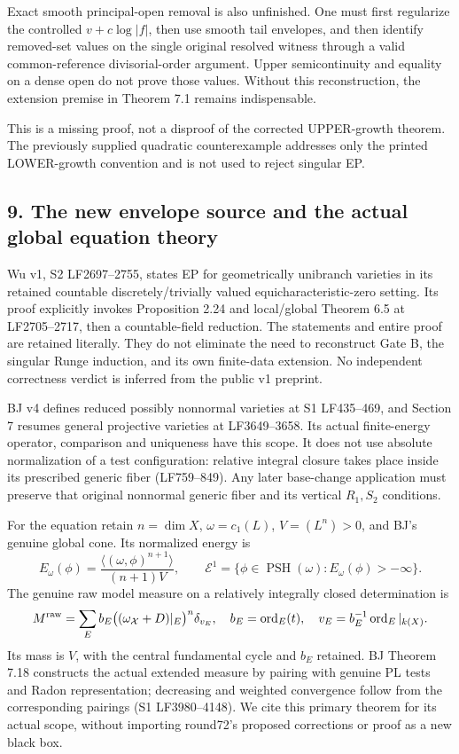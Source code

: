\documentclass[
  10pt,
]{article}
\begin{document}
Exact smooth principal-open removal is also unfinished. One must first
regularize the controlled \(v+c\log|f|\), then use smooth tail
envelopes, and then identify removed-set values on the single original
resolved witness through a valid common-reference divisorial-order
argument. Upper semicontinuity and equality on a dense open do not prove
those values. Without this reconstruction, the extension premise in
Theorem 7.1 remains indispensable.

This is a missing proof, not a disproof of the corrected UPPER-growth
theorem. The previously supplied quadratic counterexample addresses only
the printed LOWER-growth convention and is not used to reject singular
EP.

\subsection{9. The new envelope source and the actual global equation
theory}\label{the-new-envelope-source-and-the-actual-global-equation-theory}

Wu v1, S2 LF2697--2755, states EP for geometrically unibranch varieties
in its retained countable discretely/trivially valued
equicharacteristic-zero setting. Its proof explicitly invokes
Proposition 2.24 and local/global Theorem 6.5 at LF2705--2717, then a
countable-field reduction. The statements and entire proof are retained
literally. They do not eliminate the need to reconstruct Gate B, the
singular Runge induction, and its own finite-data extension. No
independent correctness verdict is inferred from the public v1 preprint.

BJ v4 defines reduced possibly nonnormal varieties at S1 LF435--469, and
Section 7 resumes general projective varieties at LF3649--3658. Its
actual finite-energy operator, comparison and uniqueness have this
scope. It does not use absolute normalization of a test configuration:
relative integral closure takes place inside its prescribed generic
fiber (LF759--849). Any later base-change application must preserve that
original nonnormal generic fiber and its vertical \(R_1,S_2\)
conditions.

For the equation retain \(n=\dim X\), \(\omega=c_1(L)\), \(V=(L^n)>0\),
and BJ's genuine global cone. Its normalized energy is
\[E_\omega(\phi)=\frac{\langle(\omega,\phi)^{n+1}\rangle}{(n+1)V},\qquad
\mathcal E^1=\{\phi\in\operatorname{PSH}(\omega):E_\omega(\phi)>-\infty\}.\]
The genuine raw model measure on a relatively integrally closed
determination is
\[M^{\rm raw}=\sum_E b_E\bigl((\omega_{\mathcal X}+D)|_E\bigr)^n\delta_{v_E},
\quad b_E=\operatorname{ord}_E(t),\quad v_E=b_E^{-1}\operatorname{ord}_E|_{k(X)}.\]
Its mass is \(V\), with the central fundamental cycle and \(b_E\)
retained. BJ Theorem 7.18 constructs the actual extended measure by
pairing with genuine PL tests and Radon representation; decreasing and
weighted convergence follow from the corresponding pairings (S1
LF3980--4148). We cite this primary theorem for its actual scope,
without importing round72's proposed corrections or proof as a new black
box.
\end{document}

